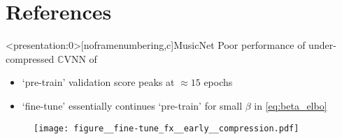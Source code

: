 \documentclass[handout]{beamer}
\newcommand{\cplx}{\mathbb{C}}
\begin{document}




\section{References} %
\label{sec:references}

\begin{frame}{\insertsection}
  \tiny
  
  
\end{frame}


\appendix
\begin{frame}<presentation:0>[noframenumbering,c]{MusicNet}{\insertsection}
  Poor performance of under-compressed $\cplx$VNN of \citet{trabelsi_deep_2018}
  \begin{itemize}
    \item `pre-train' validation score peaks at $\approx 15$ epochs
    \item `fine-tune' essentially continues `pre-train' for small $\beta$ in \eqref{eq:beta_elbo}
  \end{itemize}

  \begin{figure}[t]
    \centering
    \texttt{[image: figure\_\_fine-tune\_fx\_\_early\_\_compression.pdf]}
  \end{figure}
\end{frame}
\end{document}
